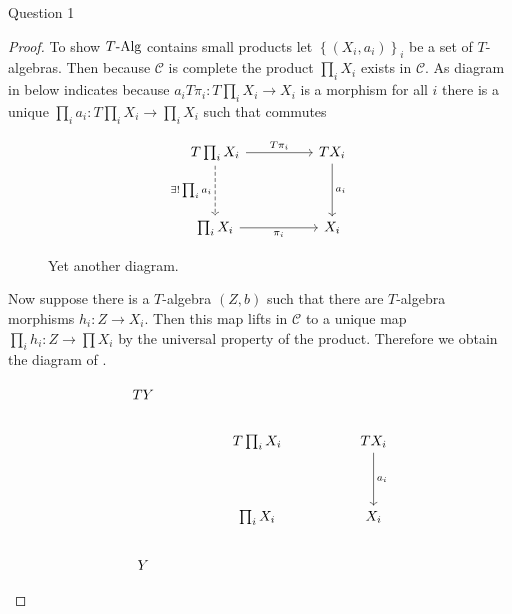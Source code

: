 \documentclass{article}
\newcommand{\cat}{\mathcal{C}}
\newcommand{\set}[1]{\left\{#1\right\}}
\newcommand{\alg}[1]{T\textnormal{-Alg}}
\newenvironment{question}[1][]{\begin{paragraph}{Question #1}}{\end{paragraph}}
\theoremstyle{definition}
\begin{document}
\begin{question}[1]
\begin{enumerate}[(a)]
\begin{proof}
                  To show \(\alg{T}\) contains small products let
                  \(\set{(X_{i},a_{i})}_{i}\) be a set of \(T\)-algebras. Then
                  because \(\cat\) is complete the product \(\prod_{i}X_{i}\)
                  exists in \(\cat\). As diagram in  below
                  indicates because \(a_{i}T\pi_{i}:T\prod_{i}X_{i}\to X_{i}\)
                  is a morphism for all \(i\) there is a unique
                  \(\prod_{i}a_{i}:T\prod_{i}X_{i}\to\prod_{i}X_{i}\) such that
                   commutes
                  \begin{figure}[H]
                      \[
                          \begin{tikzcd}[ampersand replacement=\&]
                              {T\prod_{i}X_{i}} \&\& {TX_{i}} \\
                              \\
                              {\prod_{i}X_{i}} \&\& {X_{i}}
                              \arrow["{a_{i}}", from=1-3, to=3-3]
                              \arrow["{\pi_{i}}"', from=3-1, to=3-3]
                              \arrow["{T\pi_{i}}", from=1-1, to=1-3]
                              \arrow["{\exists!\prod_{i}a_{i}}"', dashed, from=1-1, to=3-1]
                          \end{tikzcd}
                      \]
                      \caption{Yet another diagram.}
                      \label{fig:dia-3}
                  \end{figure}
                  Now suppose there is a \(T\)-algebra \((Z,b)\) such that there
                  are \(T\)-algebra morphisms \(h_{i}:Z\to X_{i}\). Then this
                  map lifts in \(\cat\) to a unique map
                  \(\prod_{i}h_{i}:Z\to\prod X_{i}\) by the universal property
                  of the product. Therefore we obtain the diagram of
                  .
                  \begin{figure}[H]
                      \[
                          \begin{tikzcd}[ampersand replacement=\&]
                              TY \\
                              \&\& {T\prod_{i}X_{i}} \&\& {TX_{i}} \\
                              \\
                              \&\& {\prod_{i}X_{i}} \&\& {X_{i}} \\
                              Y
                              \arrow["{a_{i}}", from=2-5, to=4-5]

\end{tikzcd}\]
\end{figure}
\end{proof}
\end{enumerate}
\end{question}
\end{document}
